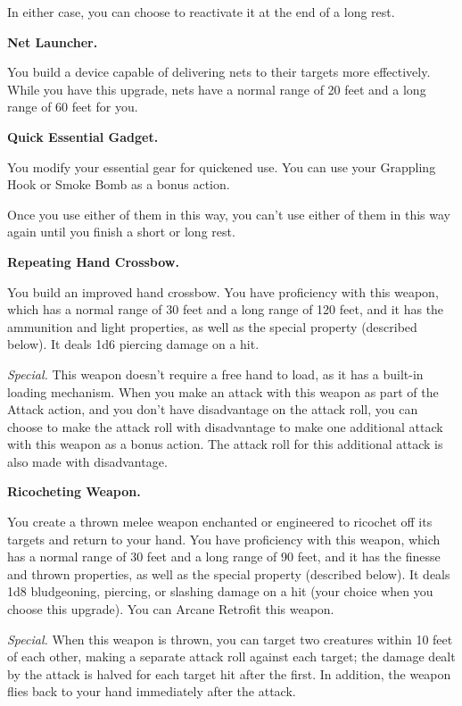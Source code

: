 \documentclass[11pt,twoside,openany]{book}  %
\begin{document}
\begin{fiveitemize}
	In either case, you can choose to reactivate it at the end of a long rest.

	\item \textbf{Net Launcher.}
	
	You build a device capable of delivering nets to their targets more effectively. While you have this upgrade, nets have a normal range of 20 feet and a long range of 60 feet for you.

	\item \textbf{Quick Essential Gadget.}
	
	You modify your essential gear for quickened use. You can use your Grappling Hook or Smoke Bomb as a bonus action.

	Once you use either of them in this way, you can’t use either of them in this way again until you finish a short or long rest.

	\item \textbf{Repeating Hand Crossbow.}
	
	You build an improved hand crossbow. You have proficiency with this weapon, which has a normal range of 30 feet and a long range of 120 feet, and it has the ammunition and light properties, as well as the special property (described below). It deals 1d6 piercing damage on a hit.
	
	\textit{Special.} This weapon doesn’t require a free hand to load, as it has a built-in loading mechanism. When you make an attack with this weapon as part of the Attack action, and you don’t have disadvantage on the attack roll, you can choose to make the attack roll with disadvantage to make one additional attack with this weapon as a bonus action. The attack roll for this additional attack is also made with disadvantage.
	
	\item \textbf{Ricocheting Weapon.}
	
	You create a thrown melee weapon enchanted or engineered to ricochet off its targets and return to your hand. You have proficiency with this weapon, which has a normal range of 30 feet and a long range of 90 feet, and it has the finesse and thrown properties, as well as the special property (described below). It deals 1d8 bludgeoning, piercing, or slashing damage on a hit (your choice when you choose this upgrade). You can Arcane Retrofit this weapon.


	\textit{Special.} When this weapon is thrown, you can target two creatures within 10 feet of each other, making a separate attack roll against each target; the damage dealt by the attack is halved for each target hit after the first. In addition, the weapon flies back to your hand immediately after the attack.


\end{fiveitemize}
\end{document}
